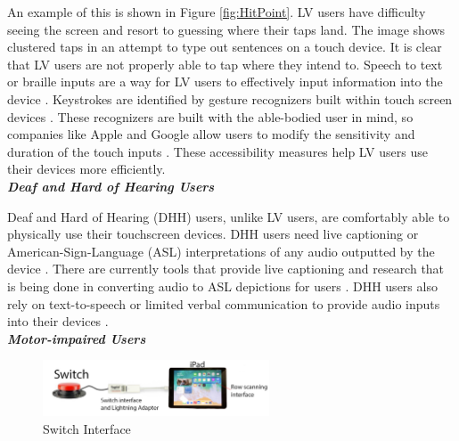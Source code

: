 An example of this is shown in Figure \ref{fig:HitPoint}. LV users have difficulty seeing the screen and resort to guessing where their taps land. The image shows clustered taps in an attempt to type out sentences on a touch device. It is clear that LV users are not properly able to tap where they intend to. Speech to text \cite{AppleAccess,GoogleAccess} or braille inputs are a way for LV users to effectively input information into the device \cite{Azenkot12}. Keystrokes are identified by gesture recognizers built within touch screen devices \cite{Peng19}. These recognizers are built with the able-bodied user in mind, so companies like Apple and Google allow users to modify the sensitivity and duration of the touch inputs \cite{Peng19,AppleAccess,GoogleAccess}. These accessibility measures help LV users use their devices more efficiently.\\ 

\noindent \textbf{\textit{Deaf and Hard of Hearing Users}}
 
Deaf and Hard of Hearing (DHH) users, unlike LV users, are comfortably able to physically use their touchscreen devices. DHH users need live captioning or American-Sign-Language (ASL) interpretations of any audio outputted by the device \cite{Berke17}. There are currently tools that provide live captioning \cite{Stream22} and research that is being done in converting audio to ASL depictions for users \cite{Bragg21}. DHH users also rely on text-to-speech or limited verbal communication to provide audio inputs into their devices \cite{Fok18}.\\

\noindent \textbf{\textit{Motor-impaired Users}}
\begin{figure}[h]
    \centering
    \includegraphics[width=0.6\textwidth]{imgs/switchInterface.jpg}
    \caption{Switch Interface}
    \label{fig:SwitchInterface}
\end{figure}

